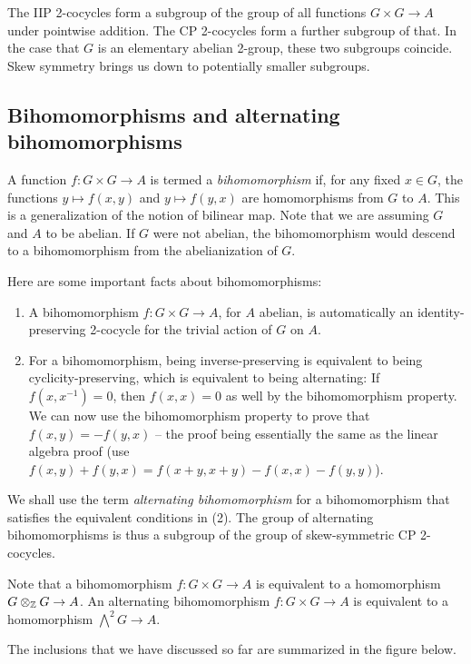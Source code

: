 \documentclass[10pt]{amsart}
\begin{document}
The IIP 2-cocycles form a subgroup of the group of all functions $G
\times G \to A$ under pointwise addition. The CP 2-cocycles form a
further subgroup of that. In the case that $G$ is an elementary
abelian 2-group, these two subgroups coincide. Skew symmetry brings us
down to potentially smaller subgroups.


\subsection{Bihomomorphisms and alternating bihomomorphisms}

A function $f: G \times G \to A$ is termed a {\em bihomomorphism} if,
for any fixed $x \in G$, the functions $y \mapsto f(x,y)$ and $y
\mapsto f(y,x)$ are homomorphisms from $G$ to $A$. This is a
generalization of the notion of bilinear map. Note that we are
assuming $G$ and $A$ to be abelian. If $G$ were not abelian, the
bihomomorphism would descend to a bihomomorphism from the
abelianization of $G$.

Here are some important facts about bihomomorphisms:

\begin{enumerate}
\item A bihomomorphism $f:G \times G \to A$, for $A$ abelian, is
  automatically an identity-preserving 2-cocycle for the trivial
  action of $G$ on $A$.
\item For a bihomomorphism, being inverse-preserving is equivalent to
  being cyclicity-preserving, which is equivalent to being
  alternating: If $f(x,x^{-1}) = 0$, then $f(x,x) = 0$ as well by the
  bihomomorphism property. We can now use the bihomomorphism property
  to prove that $f(x,y) = -f(y,x)$ -- the proof being essentially the
  same as the linear algebra proof (use $f(x,y) + f(y,x) = f(x+y,x+y)
  - f(x,x) - f(y,y)$).
\end{enumerate}

We shall use the term {\em alternating bihomomorphism} for a
bihomomorphism that satisfies the equivalent conditions in (2). The
group of alternating bihomomorphisms is thus a subgroup of the group
of skew-symmetric CP 2-cocycles.

Note that a bihomomorphism $f:G \times G \to A$ is equivalent to a
homomorphism $G \otimes_{\mathbb{Z}} G \to A$. An alternating bihomomorphism $f:
G \times G \to A$ is equivalent to a homomorphism $\bigwedge^2 G \to
A$.

The inclusions that we have discussed so far are summarized in the figure below.
\end{document}
